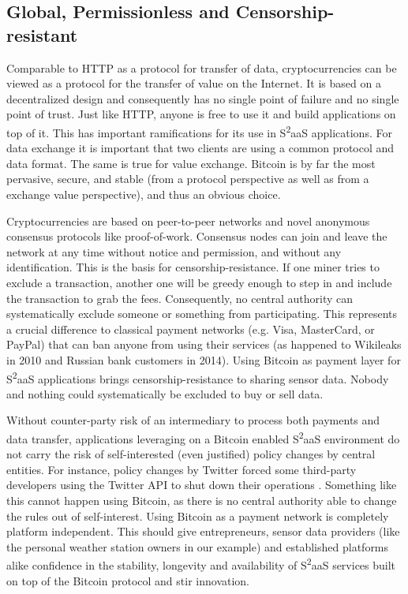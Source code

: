 \subsection{Global, Permissionless and Censorship-resistant}

Comparable to \ac{HTTP} as a protocol for transfer of data, cryptocurrencies can be viewed as a protocol for the transfer of value on the Internet. It is based on a decentralized design and consequently has no single point of failure and no single point of trust. Just like \ac{HTTP}, anyone is free to use it and build applications on top of it. This has important ramifications for its use in S\textsuperscript{2}aaS applications. For data exchange it is important that two clients are using a common protocol and data format. The same is true for value exchange. Bitcoin is by far the most pervasive, secure, and stable (from a protocol perspective as well as from a exchange value perspective), and thus an obvious choice.

Cryptocurrencies are based on peer-to-peer networks and novel anonymous consensus protocols like proof-of-work. Consensus nodes can join and leave the network at any time without notice and permission, and without any identification. This is the basis for censorship-resistance. If one miner tries to exclude a transaction, another one will be greedy enough to step in and include the transaction to grab the fees. Consequently, no central authority can systematically exclude someone or something from participating. This represents a crucial difference to classical payment networks (e.g. Visa, MasterCard, or PayPal) that can ban anyone from using their services (as happened to Wikileaks in 2010 and Russian bank customers in 2014). Using Bitcoin as payment layer for S\textsuperscript{2}aaS applications brings censorship-resistance to sharing sensor data. Nobody and nothing could systematically be excluded to buy or sell data.

Without counter-party risk of an intermediary to process both payments and data transfer, applications leveraging on a Bitcoin enabled S\textsuperscript{2}aaS  environment do not carry the risk of self-interested (even justified) policy changes by central entities. For instance, policy changes by Twitter forced some third-party developers using the Twitter API to shut down their operations \parencite{twitterAPI}. Something like this cannot happen using Bitcoin, as there is no central authority able to change the rules out of self-interest. Using Bitcoin as a payment network is completely platform independent. This should give entrepreneurs, sensor data providers (like the personal weather station owners in our example) and established platforms alike confidence in the stability, longevity and availability of S\textsuperscript{2}aaS services built on top of the Bitcoin protocol and stir innovation.

